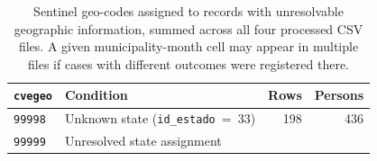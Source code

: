 \documentclass[3p]{elsarticle}
\begin{document}
  \begin{table}[ht]                                                                                                                                                                           
    \centering                                                                                                                                                                              
    \caption{Sentinel geo-codes assigned to records with                                                                                                                                    
      unresolvable geographic information, summed across all four
      processed CSV files. A given municipality-month cell may appear
      in multiple files if cases with different outcomes were registered                                                                                                                      
      there.}
    \label{tab:sentinels}                                                                                                                                                                     
    \renewcommand{\arraystretch}{1.2}                                                                                                                                                       
    \begin{tabular}{llrr}                                                                                                                                                                   
      \toprule                                                                                                                                                                                
      \texttt{cvegeo} & Condition & Rows & Persons \\
      \midrule                                                                                                                                                                                
      \texttt{99998} & Unknown state (\texttt{id\_estado}~=~33)                                                                                                                             
                     & 198 & 436 \\                                                                                                                                                         
      \texttt{99999} & Unresolved state assignment                                                                                                                                            

\end{tabular}
\end{table}
\end{document}
